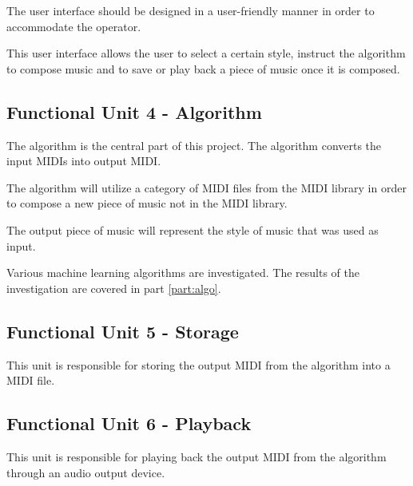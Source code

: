 The user interface should be designed in a user-friendly manner in order to accommodate the operator.

This user interface allows the user to select a certain style, instruct the algorithm to compose music and to save or play back a piece of music once it is composed.

\subsection{Functional Unit 4 - Algorithm}
The algorithm is the central part of this project. The algorithm converts the input \acp{MIDI} into output \ac{MIDI}.

The algorithm will utilize a category of \ac{MIDI} files from the \ac{MIDI} library in order to compose a new piece of music not in the \ac{MIDI} library.

The output piece of music will represent the style of music that was used as input.

Various machine learning algorithms are investigated. The results of the investigation are covered in part \ref{part:algo}.

\subsection{Functional Unit 5 - Storage}
This unit is responsible for storing the output \ac{MIDI} from the algorithm into a \ac{MIDI} file.

\subsection{Functional Unit 6 - Playback}
This unit is responsible for playing back the output \ac{MIDI} from the algorithm through an audio output device.

